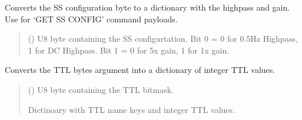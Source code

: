 \documentclass[letterpaper,10pt,english]{sphinxmanual}
\begin{document}
\begin{fulllineitems}
\begin{fulllineitems}
\label{\detokenize{PodApi.Devices:PodApi.Devices.PodDevice_8401HR.Pod8401HR.DecodeSSConfigBitmask}}
\pysigstartsignatures
{}
\pysigstopsignatures
\sphinxAtStartPar
Converts the SS configuration byte to a dictionary with the high\sphinxhyphen{}pass and gain.         Use for ‘GET SS CONFIG’ command payloads.
\begin{quote}\begin{description}
\sphinxAtStartPar
{} () \textendash{} U8 byte containing the SS configurtation. Bit 0 = 0 for 0.5Hz Highpass,                 1 for DC Highpass. Bit 1 = 0 for 5x gain, 1 for 1x gain.

\end{description}\end{quote}

\end{fulllineitems}


\begin{fulllineitems}
\label{\detokenize{PodApi.Devices:PodApi.Devices.PodDevice_8401HR.Pod8401HR.DecodeTTLByte}}
\pysigstartsignatures
{}
\pysigstopsignatures
\sphinxAtStartPar
Converts the TTL bytes argument into a dictionary of integer TTL values.
\begin{quote}\begin{description}
\sphinxAtStartPar
{} () \textendash{} U8 byte containing the TTL bitmask.

\sphinxAtStartPar
Dictinoary with TTL name keys and integer TTL values.


\end{description}
\end{quote}
\end{fulllineitems}
\end{fulllineitems}
\end{document}

